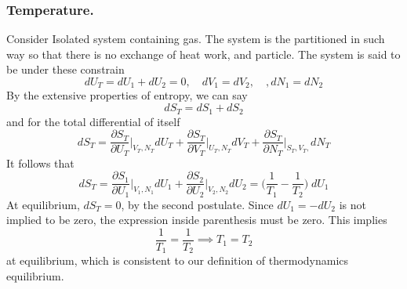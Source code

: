 \documentclass[../../../Main.tex]{subfiles}
\begin{document}
\subsubsection{Temperature.} Consider Isolated system containing gas. The system is the partitioned in such way so that there is no exchange of heat work, and particle. The system is said to be under these constrain
\begin{equation*}
    dU_T=dU_1+dU_2=0, \quad dV_1 =dV_2, \quad, dN_1=dN_2
\end{equation*}
By the extensive properties of entropy, we can say 
\begin{equation*}
    dS_T=dS_1+dS_2
\end{equation*}
and for the total differential of itself
\begin{equation*}
    dS_T= \frac{\partial S_T}{\partial U_T}\bigg|_{V_T,N_T} dU_T + \frac{ \partial S_T}{\partial V_T}\bigg|_{U_T,N_T} dV_T+ \frac{\partial S_T}{\partial N_T}\bigg|_{S_T,V_T,}dN_T
\end{equation*}
It follows that 
\begin{equation*}
    dS_T=\frac{\partial S_1}{\partial U_1}\bigg|_{V_1,N_1} dU_1 + \frac{\partial S_2}{\partial U_2}\bigg|_{V_2,N_2} dU_2  = \biggl(\frac{1}{T_1}-\frac{1}{T_2}\biggr)\;dU_1
\end{equation*}
At equilibrium, $dS_T=0$, by the second postulate. Since $dU_1=-dU_2$ is not implied to be zero, the expression inside parenthesis must be zero. This implies
\begin{equation*}
    \frac{1}{T_1}=\frac{1 }{T_2}\implies T_1=T_2
\end{equation*}
at equilibrium, which is consistent to our definition of thermodynamics equilibrium.
\end{document}
